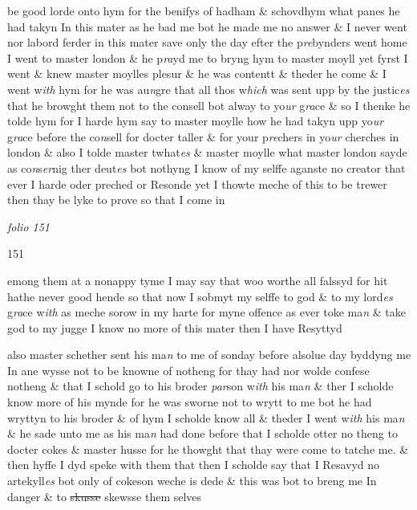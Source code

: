 \documentclass[12pt, a4paper]{book}
\begin{document}
 be good lorde onto hym for the benifys of hadham \& schovdhym
 what panes he had takyn In this mater  as he bad me
			 bot he made me no
 answer \& I never went nor labord ferder in this mater save
 only the day efter the p\textit{re}bynders went home I went to
 		master london \& he p\textit{ra}yd me to bryng hym to master moyll
 		yet fyrst I went \& knew master moylles plesur \& he was
 contentt \& theder he come \& I went w\textit{ith} hym for he was au\textit{n}gre
 that all thos w\textit{hich} was sent upp by the justic\textit{es} that he browght
 them not to the consell bot alway to yo\textit{ur} g\textit{ra}ce \& so I thenke he
 		tolde hym for I harde hym say to master moylle how he had
 takyn upp yo\textit{ur }g\textit{ra}ce before the co\textit{n}sell for docter taller \& for
			 your
 		p\textit{re}chers in yo\textit{ur} cherches in london \& also I tolde master twhat\textit{es} \&
 		master moylle what master london sayde as co\textit{n}s\textit{er}nig ther deut\textit{es}
 bot nothyng I know of my selffe aganste no creator that ever I
 harde oder preched or Resonde yet I thowte meche of this
 to be trewer then thay be lyke to prove so that I come in

\dotfill
						\newpage
{}

\textit{folio 151}


\begin{flushright}{\color{Mahogany}151}\end{flushright}
 
		\ifthenelse{\isodd{\thepage}}
		{\reversemarginpar}
		{\normalmarginpar}
		emong them at a nonappy tyme I may say that woo worthe
 all falssyd for hit hathe never good hende so that now I sobmyt
 my selffe to god \& to my lord\textit{es} g\textit{ra}ce w\textit{ith} as meche sorow in my
 harte for myne offence as ever toke ma\textit{n} \& take god to my jugge
 I know no more of this mater then I have Resyttyd
 	
		\ifthenelse{\isodd{\thepage}}
		{\reversemarginpar}
		{\normalmarginpar}
		also master schether sent his ma\textit{n} to me of sonday before alsolue day
 byddyng me In ane wysse not to be knowne of notheng for thay
 had nor wolde confese notheng \& that I schold go to his broder \textit{par}son
 w\textit{ith} his ma\textit{n} \& ther I scholde know more of his mynde for he was sworne
 not to wrytt to me bot he had wryttyn to his broder \& of hym I
 scholde know all \& theder I went w\textit{ith} his ma\textit{n} \& he sade unto
 me as his ma\textit{n} had done before that I scholde otter no theng to
 docter cokes \& master husse for he thowght that thay were
 come to
			 tatche me. \& then hyffe I dyd speke with them that then I
 scholde say that I Resavyd no artekyll\textit{es} bot only of cokeson
 weche is dede \& this was bot to breng me In danger \& to
 \sout{skusse} skewsse them selves
 	
\end{document}
